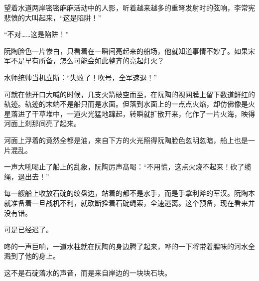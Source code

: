 望着水道两岸密密麻麻活动中的人影，听着越来越多的重弩发射时的弦响，李常宪悲愤的大叫起来，“这是陷阱！”

“不对……这是陷阱！”

阮陶脸色一片惨白，只看着在一瞬间亮起来的船场，他就知道事情不妙了。如果宋军不是早有所备，怎么可能会如此整齐的亮起灯火？

水师统帅当机立断：“失败了！吹号，全军速退！”

可就在他开口大喊的时候，几支火箭破空而至，在阮陶的视网膜上留下数道鲜红的轨迹。轨迹的末端不是船只而是水面。但落到水面上的一点点火焰，却仿佛像是火星落进了干草堆中，一道火光猛地蹿起，转瞬就扩散开来，化作了一片火海，映得河面上刹那间亮了起来。

河面上浮着的竟然全都是油，来自下方的火光照得阮陶脸色忽明忽暗，船上也是一片混乱。

一声大吼喝止了船上的乱象，阮陶厉声髙喝：“不用慌，这点火烧不起来！砍了缆绳，退出去！”

每一艘船上收放石碇的绞盘边，站着的都不是水手，而是手拿利斧的军汉。阮陶本就准备着一旦战机不利，就砍断拴着石碇绳索，全速逃离。这个预备，现在看来并没有错。

可是已经迟了。

咚的一声巨响，一道水柱就在阮陶的身边腾了起来，哗的一下将带着腥味的河水全溅到了他的身上。

这不是石碇落水的声音，而是来自岸边的一块块石块。

